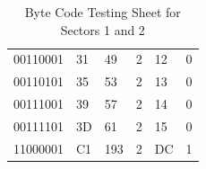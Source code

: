 \documentclass[12pt,a4paper]{report}
\begin{document}
\begin{table}[]
\begin{tabular}{llllll}
00110001                                               & 31        & 49            & 2      & 12     & 0       \\
00110101                                               & 35        & 53            & 2      & 13     & 0       \\
00111001                                               & 39        & 57            & 2      & 14     & 0       \\
00111101                                               & 3D        & 61            & 2      & 15     & 0       \\
11000001                                               & C1        & 193           & 2      & DC     & 1       \\    
\end{tabular}
\caption{Byte Code Testing Sheet for Sectors 1 and 2} %
\label{tab:Testing Table Sectors 1 and 2} 
\end{table}
\end{document}
